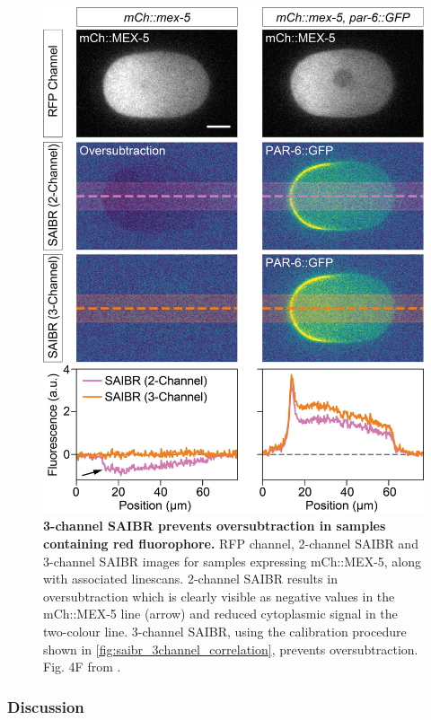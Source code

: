 \documentclass[12pt]{"article"}
\newcommand{\mycaption}[2]{\caption[#1]{\textbf{#1.} #2}}
\begin{document}
\begin{figure}
\includegraphics[scale=1]{saibr_3channel_correction}
\mycaption{3-channel SAIBR prevents oversubtraction in samples containing red fluorophore}{
RFP channel, 2-channel SAIBR and 3-channel SAIBR images for samples expressing mCh::MEX-5, along with associated linescans. 2-channel SAIBR results in oversubtraction which is clearly visible as negative values in the mCh::MEX-5 line (arrow) and reduced cytoplasmic signal in the two-colour line. 3-channel SAIBR, using the calibration procedure shown in \cref{fig:saibr_3channel_correlation}, prevents oversubtraction.
Fig. 4F from \textcite{Rodrigues2022}.}
\label{fig:saibr_3channel_correction}
\end{figure}


\subsubsection{Discussion}
\end{document}
